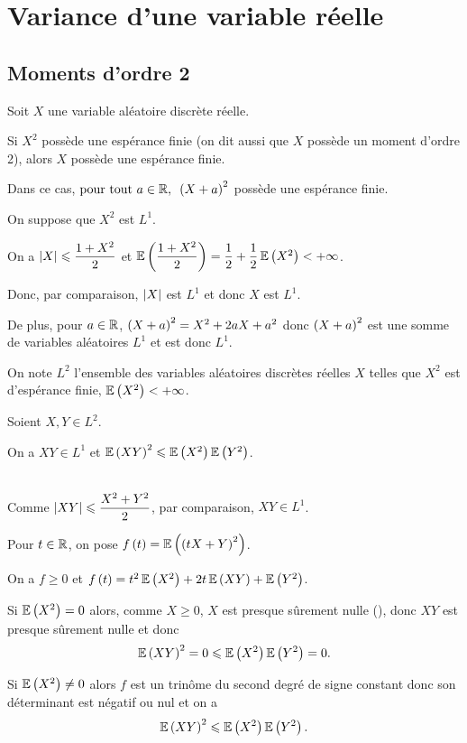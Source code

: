 \section{Variance d'une variable réelle}

\subsection{Moments d'ordre 2}

\begin{prop}
Soit \(X\) une variable aléatoire discrète réelle.

Si \(X^2\) possède une espérance finie (on dit aussi que \(X\) possède un moment d'ordre 2), alors \(X\) possède une espérance finie.

Dans ce cas, \(\quantifs{\tpt a\in\R}\paren{X+a}^2\) possède une espérance finie.
\end{prop}

\begin{dem}
On suppose que \(X^2\) est \(L^1\).

On a \(\left\lvert X\right\rvert\leqslant\dfrac{1+X^2}{2}\) et \(\operatorname{\mathbb{E}}\left(\dfrac{1+X^2}{2}\right)=\dfrac{1}{2}+\dfrac{1}{2}\operatorname{\mathbb{E}}\left(X^2\right)<+\infty\).

Donc, par comparaison, \(\left\lvert X\right\rvert\) est \(L^1\) et donc \(X\) est \(L^1\).

De plus, pour \(a\in\mathbb{R}\), \(\left(X+a\right)^2=X^2+2aX+a^2\) donc \(\left(X+a\right)^2\) est une somme de variables aléatoires \(L^1\) et est donc \(L^1\).
\end{dem}

On note \(L^2\) l'ensemble des variables aléatoires discrètes réelles \(X\) telles que \(X^2\) est d'espérance finie, \ie \(\operatorname{\mathbb{E}}\left(X^2\right)<+\infty\).

\begin{prop}
Soient \(X,Y\in L^2\).

On a \(XY\in L^1\) et \(\operatorname{\mathbb{E}}\left(XY\right)^2\leqslant\operatorname{\mathbb{E}}\left(X^2\right)\operatorname{\mathbb{E}}\left(Y^2\right)\).
\end{prop}

\begin{dem}~\\
Comme \(\left\lvert XY\right\rvert\leqslant\dfrac{X^2+Y^2}{2}\), par comparaison, \(XY\in L^1\).

Pour \(t\in\mathbb{R}\), on pose \(f\left(t\right)=\operatorname{\mathbb{E}}\left(\left(tX+Y\right)^2\right)\).

On a \(f\geq0\) et \(f\left(t\right)=t^2\operatorname{\mathbb{E}}\left(X^2\right)+2t\operatorname{\mathbb{E}}\left(XY\right)+\operatorname{\mathbb{E}}\left(Y^2\right)\).

Si \(\operatorname{\mathbb{E}}\left(X^2\right)=0\) alors, comme \(X\geq0\), \(X\) est presque sûrement nulle (), donc \(XY\) est presque sûrement nulle et donc \[\operatorname{\mathbb{E}}\left(XY\right)^2=0\leqslant\operatorname{\mathbb{E}}\left(X^2\right)\operatorname{\mathbb{E}}\left(Y^2\right)=0.\]

Si \(\operatorname{\mathbb{E}}\left(X^2\right)\not=0\) alors \(f\) est un trinôme du second degré de signe constant donc son déterminant est négatif ou nul et on a \[\operatorname{\mathbb{E}}\left(XY\right)^2\leqslant\operatorname{\mathbb{E}}\left(X^2\right)\operatorname{\mathbb{E}}\left(Y^2\right).\]
\end{dem}


